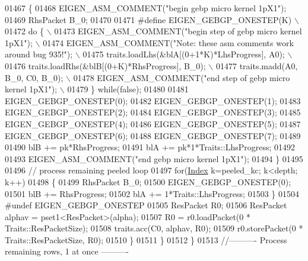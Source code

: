 \begin{DoxyCode}
01467           \{
01468             EIGEN\_ASM\_COMMENT(\textcolor{stringliteral}{"begin gebp micro kernel 1pX1"});
01469             RhsPacket B\_0;
01470         
01471 \textcolor{preprocessor}{#define EIGEN\_GEBGP\_ONESTEP(K) \(\backslash\)}
01472 \textcolor{preprocessor}{            do \{                                                                \(\backslash\)}
01473 \textcolor{preprocessor}{              EIGEN\_ASM\_COMMENT("begin step of gebp micro kernel 1pX1");        \(\backslash\)}
01474 \textcolor{preprocessor}{              EIGEN\_ASM\_COMMENT("Note: these asm comments work around bug 935!"); \(\backslash\)}
01475 \textcolor{preprocessor}{              traits.loadLhs(&blA[(0+1*K)*LhsProgress], A0);                    \(\backslash\)}
01476 \textcolor{preprocessor}{              traits.loadRhs(&blB[(0+K)*RhsProgress], B\_0);                     \(\backslash\)}
01477 \textcolor{preprocessor}{              traits.madd(A0, B\_0, C0, B\_0);                                    \(\backslash\)}
01478 \textcolor{preprocessor}{              EIGEN\_ASM\_COMMENT("end step of gebp micro kernel 1pX1");          \(\backslash\)}
01479 \textcolor{preprocessor}{            \} while(false);}
01480 
01481             EIGEN\_GEBGP\_ONESTEP(0);
01482             EIGEN\_GEBGP\_ONESTEP(1);
01483             EIGEN\_GEBGP\_ONESTEP(2);
01484             EIGEN\_GEBGP\_ONESTEP(3);
01485             EIGEN\_GEBGP\_ONESTEP(4);
01486             EIGEN\_GEBGP\_ONESTEP(5);
01487             EIGEN\_GEBGP\_ONESTEP(6);
01488             EIGEN\_GEBGP\_ONESTEP(7);
01489 
01490             blB += pk*RhsProgress;
01491             blA += pk*1*Traits::LhsProgress;
01492 
01493             EIGEN\_ASM\_COMMENT(\textcolor{stringliteral}{"end gebp micro kernel 1pX1"});
01494           \}
01495 
01496           \textcolor{comment}{// process remaining peeled loop}
01497           \textcolor{keywordflow}{for}(\hyperlink{namespace_eigen_a62e77e0933482dafde8fe197d9a2cfde}{Index} k=peeled\_kc; k<depth; k++)
01498           \{
01499             RhsPacket B\_0;
01500             EIGEN\_GEBGP\_ONESTEP(0);
01501             blB += RhsProgress;
01502             blA += 1*Traits::LhsProgress;
01503           \}
01504 \textcolor{preprocessor}{#undef EIGEN\_GEBGP\_ONESTEP}
01505           ResPacket R0;
01506           ResPacket alphav = pset1<ResPacket>(alpha);
01507           R0 = r0.loadPacket(0 * Traits::ResPacketSize);
01508           traits.acc(C0, alphav, R0);
01509           r0.storePacket(0 * Traits::ResPacketSize, R0);
01510         \}
01511       \}
01512     \}
01513     \textcolor{comment}{//---------- Process remaining rows, 1 at once ----------}

\end{DoxyCode}
